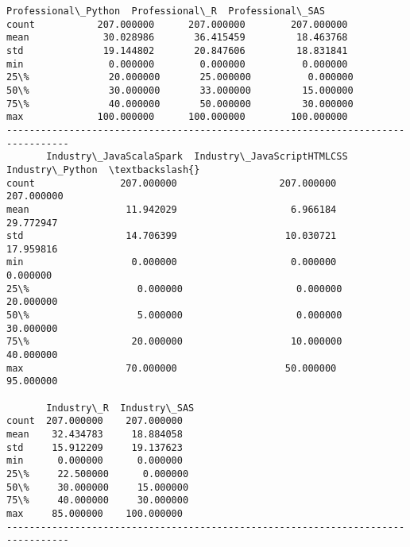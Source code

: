 \documentclass[11pt]{article}
\begin{document}
\begin{Verbatim}[commandchars=\\\{\}]
       Professional\_Python  Professional\_R  Professional\_SAS  
count           207.000000      207.000000        207.000000  
mean             30.028986       36.415459         18.463768  
std              19.144802       20.847606         18.831841  
min               0.000000        0.000000          0.000000  
25\%              20.000000       25.000000          0.000000  
50\%              30.000000       33.000000         15.000000  
75\%              40.000000       50.000000         30.000000  
max             100.000000      100.000000        100.000000  
---------------------------------------------------------------------------------
       Industry\_JavaScalaSpark  Industry\_JavaScriptHTMLCSS  Industry\_Python  \textbackslash{}
count               207.000000                  207.000000       207.000000   
mean                 11.942029                    6.966184        29.772947   
std                  14.706399                   10.030721        17.959816   
min                   0.000000                    0.000000         0.000000   
25\%                   0.000000                    0.000000        20.000000   
50\%                   5.000000                    0.000000        30.000000   
75\%                  20.000000                   10.000000        40.000000   
max                  70.000000                   50.000000        95.000000   

       Industry\_R  Industry\_SAS  
count  207.000000    207.000000  
mean    32.434783     18.884058  
std     15.912209     19.137623  
min      0.000000      0.000000  
25\%     22.500000      0.000000  
50\%     30.000000     15.000000  
75\%     40.000000     30.000000  
max     85.000000    100.000000  
---------------------------------------------------------------------------------

    \end{Verbatim}
\end{document}
